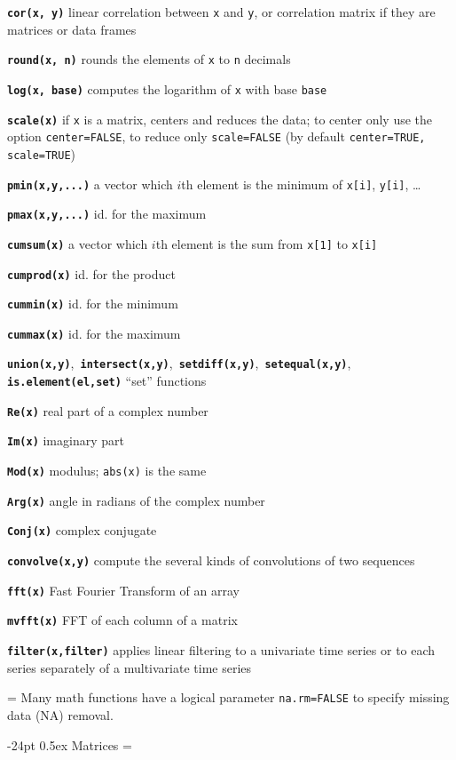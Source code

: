 \documentclass[10pt,landscape]{article}
\makeatletter
\renewcommand\section{\@startsection{section}{1}{0mm}%
                                     {-24pt}%
                                     {0.5ex}%
                                {\color{blue}\normalfont\large\bfseries}}
\newcommand{\code}{\texttt}
\newcommand{\bcode}[1]{\texttt{\textbf{#1}}}
\makeatother
\begin{document}
\begin{multicols}{3}
\bcode{cor(x, y)}  linear correlation between \code{x} and \code{y}, or correlation matrix if they are matrices or data frames

\bcode{round(x, n)}  rounds the elements of \code{x} to \code{n}
decimals

\bcode{log(x, base)}  computes the logarithm of \code{x} with base \code{base}

\bcode{scale(x)}  if \code{x} is a matrix, centers and reduces the data; to center only use the option \code{center=FALSE}, to reduce only \code{scale=FALSE} (by default \code{center=TRUE, scale=TRUE})

\bcode{pmin(x,y,...)}  a vector which $i$th element is the minimum of \code{x[i]}, \code{y[i]}, \ldots

\bcode{pmax(x,y,...)}  id. for the maximum

\bcode{cumsum(x)}  a vector which $i$th element is the sum from \code{x[1]} to \code{x[i]}

\bcode{cumprod(x)}  id. for the product

\bcode{cummin(x)}  id. for the minimum

\bcode{cummax(x)}  id. for the maximum

\bcode{union(x,y)},~\bcode{intersect(x,y)},~\bcode{setdiff(x,y)},~\bcode{setequal(x,y)}, \bcode{is.element(el,set)} ``set'' functions

\bcode{Re(x)} real part of a complex number

\bcode{Im(x)} imaginary part

\bcode{Mod(x)} modulus; \code{abs(x)} is the same

\bcode{Arg(x)} angle in radians of the complex number

\bcode{Conj(x)} complex conjugate

\bcode{convolve(x,y)} compute the several kinds of
     convolutions of two sequences

\bcode{fft(x)} Fast Fourier Transform of an array

\bcode{mvfft(x)} FFT of each column of a matrix

\bcode{filter(x,filter)} applies linear filtering to a univariate time series or to each
     series separately of a multivariate time series

\everypar={\hangindent=0mm}
Many math functions have a logical parameter \code{na.rm=FALSE} to
specify missing data (NA) removal.




\section{Matrices}
\everypar={\hangindent=9mm}


\end{multicols}
\end{document}
